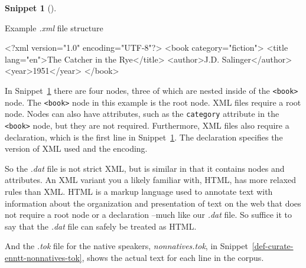 \documentclass[
  letterpaper,
  krantz1]{latex/krantz-mod}
\newenvironment{Shaded}{\begin{snugshade}}{\end{snugshade}}
\newcommand{\FunctionTok}[1]{\textcolor[rgb]{0.00,0.00,0.00}{#1}}
\newcommand{\KeywordTok}[1]{\textcolor[rgb]{0.00,0.00,0.00}{#1}}
\newcommand{\NormalTok}[1]{\textcolor[rgb]{0.00,0.00,0.00}{#1}}
\newcommand{\OtherTok}[1]{\textcolor[rgb]{0.00,0.00,0.00}{#1}}
\newcommand{\StringTok}[1]{\textcolor[rgb]{0.00,0.00,0.00}{#1}}
\theoremstyle{definition}
\theoremstyle{definition}
\newtheorem{definition}{Snippet}[chapter]
\theoremstyle{remark}
\begin{document}
\begin{definition}[]\protect\hypertarget{def-curate-xml}{}\label{def-curate-xml}

Example \emph{.xml} file structure

\begin{Shaded}
\begin{Highlighting}[]
\FunctionTok{\textless{}?xml}\OtherTok{ version=}\StringTok{"1.0"}\OtherTok{ encoding=}\StringTok{"UTF{-}8"}\FunctionTok{?\textgreater{}}
\NormalTok{\textless{}}\KeywordTok{book}\OtherTok{ category=}\StringTok{"fiction"}\NormalTok{\textgreater{}}
\NormalTok{  \textless{}}\KeywordTok{title}\OtherTok{ lang=}\StringTok{"en"}\NormalTok{\textgreater{}The Catcher in the Rye\textless{}/}\KeywordTok{title}\NormalTok{\textgreater{}}
\NormalTok{  \textless{}}\KeywordTok{author}\NormalTok{\textgreater{}J.D. Salinger\textless{}/}\KeywordTok{author}\NormalTok{\textgreater{}}
\NormalTok{  \textless{}}\KeywordTok{year}\NormalTok{\textgreater{}1951\textless{}/}\KeywordTok{year}\NormalTok{\textgreater{}}
\NormalTok{\textless{}/}\KeywordTok{book}\NormalTok{\textgreater{}}
\end{Highlighting}
\end{Shaded}

\end{definition}

In Snippet~\ref{def-curate-xml} there are four nodes, three of which are
nested inside of the \texttt{\textless{}book\textgreater{}} node. The
\texttt{\textless{}book\textgreater{}} node in this example is the root
node. XML files require a root node. Nodes can also have attributes,
such as the \texttt{category} attribute in the
\texttt{\textless{}book\textgreater{}} node, but they are not required.
Furthermore, XML files also require a declaration, which is the first
line in Snippet~\ref{def-curate-xml}. The declaration specifies the
version of XML used and the encoding.

So the \emph{.dat} file is not strict XML, but is similar in that it
contains nodes and attributes. An XML variant you a likely familiar
with, HTML, has more relaxed rules than XML. HTML is a markup language
used to annotate text with information about the organization and
presentation of text on the web that does not require a root node or a
declaration --much like our \emph{.dat} file. So suffice it to say that
the \emph{.dat} file can safely be treated as HTML.

And the \emph{.tok} file for the native speakers, \emph{nonnatives.tok},
in Snippet~\ref{def-curate-enntt-nonnatives-tok}, shows the actual text
for each line in the corpus.
\end{document}
